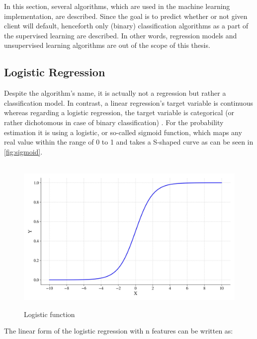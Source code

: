In this section, several algorithms, which are used in the machine learning implementation, are described. Since the goal is to predict whether or not given client will default, henceforth only (binary) classification algorithms as a part of the supervised learning are described. In other words, regression models and unsupervised learning algorithms are out of the scope of this thesis.
\subsection{Logistic Regression}
\label{subsubsec:logisticregression}

Despite the algorithm's name, it is actually not a regression but rather a classification model.
In contrast, a linear regression's target variable is continuous whereas regarding a logistic regression, the target variable is categorical (or rather dichotomous in case of binary classification) \citep{wendler2021data}.
For the probability estimation it is using a logistic, or so-called sigmoid function, which maps any real value within the range of 0 to 1 and takes a S-shaped curve as can be seen in \autoref{fig:sigmoid}.

\begin{figure}[H]
    \centering
    \caption{Logistic function}\vspace{0.5em}
    \label{fig:sigmoid}\
    \includegraphics[width=130mm]{Figures/sigmoid.jpg}
    \vspace{-1em}
\end{figure}

The linear form of the logistic regression with n features can be written as:


